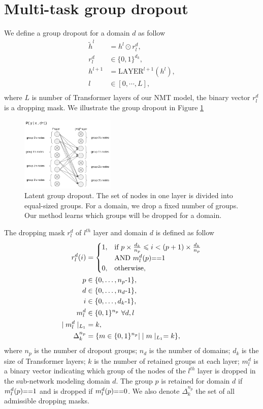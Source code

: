 \documentclass[11pt]{article}
\begin{document}
\section{Multi-task group dropout}
We define a group dropout for a domain $d$ as follow
\begin{align*}
\tilde{h}^l &= h^l \odot r_l^d ,\\
r_l^d &\in \{ 0,1 \}^{d_k}, \\
h^{l+1} &= \text{LAYER}^{l+1}(h^l) ,\\
l & \in [0,\cdots,L] ,\\
\end{align*}
where $L$ is number of Transformer layers of our NMT model, the binary vector $r_l^d$ is a dropping mask. We illustrate the group dropout in Figure \ref{fig:group_dropout}
\begin{figure}
\includegraphics[width=0.4\textwidth]{group_dropout}
\caption{Latent group dropout. The set of nodes in one layer is divided into equal-sized groups. For a domain, we drop a fixed number of groups. Our method learns which groups will be dropped for a domain.}
\label{fig:group_dropout}
\end{figure}
 The dropping mask $r_l^d$ of $l^{th}$ layer and domain $d$ is defined as follow
\begin{align*}
r_l^d(i) &= \begin{cases}
      1, & \text{if}\ p \times \frac{d_k}{n_p} \leqslant i < (p+1) \times \frac{d_k}{n_p} \\
      & \text{AND} \  m_l^d(p) \text{\small ==} 1 \\
      0, & \text{otherwise},
    \end{cases} \\
p & \in  \{0,\dots,n_p\text{-}1 \}, \\
d & \in  \{0,\dots,n_d\text{-}1 \}, \\
i & \in  \{0,\dots,d_k\text{-}1 \}, \\
m_l^d & \in  \{0,1\}^{n_p} \ \forall d,l \, \\
\mid m_l^d \mid_{L_1} & =  k , \\
\Delta^{n_p}_k & =  \{ m \in \{0,1\}^{n_p} | \mid m \mid_{L_1} = k \},
\end{align*}
where $n_p$ is the number of dropout groups; $n_d$ is the number of domains; $d_k$ is the size of Transformer layers; $k$ is the number of retained groups at each layer; $m_l^d$ is a binary vector indicating which group of the nodes of the $l^{th}$ layer is dropped in the sub-network modeling domain $d$. The group $p$ is retained for domain $d$ if $m_l^d(p)\text{\small ==}1$ and is dropped if $m_l^d(p)\text{\small ==}0$. We also denote $\Delta^{n_p}_k$ the set of all admissible dropping masks. 
\end{document}
